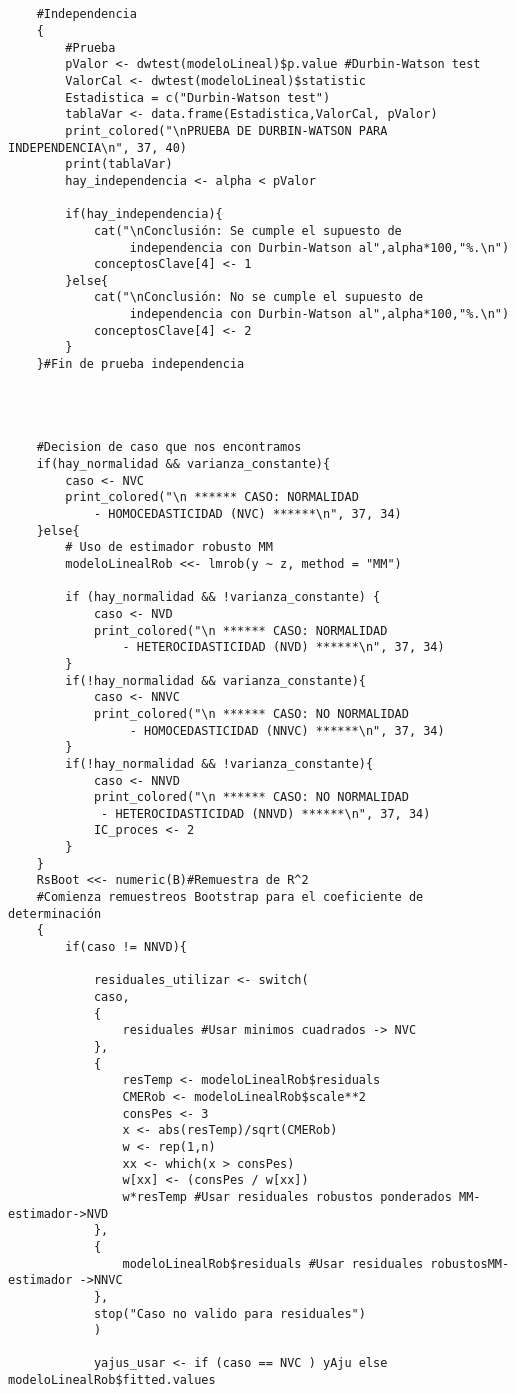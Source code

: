 \begin{verbatim}
	
	
	#Independencia
	{
		#Prueba
		pValor <- dwtest(modeloLineal)$p.value #Durbin-Watson test
		ValorCal <- dwtest(modeloLineal)$statistic
		Estadistica = c("Durbin-Watson test")
		tablaVar <- data.frame(Estadistica,ValorCal, pValor)
		print_colored("\nPRUEBA DE DURBIN-WATSON PARA INDEPENDENCIA\n", 37, 40)
		print(tablaVar)
		hay_independencia <- alpha < pValor
		
		if(hay_independencia){
			cat("\nConclusión: Se cumple el supuesto de
				 independencia con Durbin-Watson al",alpha*100,"%.\n")
			conceptosClave[4] <- 1
		}else{
			cat("\nConclusión: No se cumple el supuesto de
				 independencia con Durbin-Watson al",alpha*100,"%.\n")
			conceptosClave[4] <- 2
		}
	}#Fin de prueba independencia
	
	
	
	
	#Decision de caso que nos encontramos
	if(hay_normalidad && varianza_constante){
		caso <- NVC
		print_colored("\n ****** CASO: NORMALIDAD 
			- HOMOCEDASTICIDAD (NVC) ******\n", 37, 34)
	}else{
		# Uso de estimador robusto MM  
		modeloLinealRob <<- lmrob(y ~ z, method = "MM")
		
		if (hay_normalidad && !varianza_constante) {
			caso <- NVD
			print_colored("\n ****** CASO: NORMALIDAD 
				- HETEROCIDASTICIDAD (NVD) ******\n", 37, 34)
		}
		if(!hay_normalidad && varianza_constante){
			caso <- NNVC
			print_colored("\n ****** CASO: NO NORMALIDAD
				 - HOMOCEDASTICIDAD (NNVC) ******\n", 37, 34)
		}
		if(!hay_normalidad && !varianza_constante){
			caso <- NNVD
			print_colored("\n ****** CASO: NO NORMALIDAD
			 - HETEROCIDASTICIDAD (NNVD) ******\n", 37, 34)
			IC_proces <- 2
		}
	}
	RsBoot <<- numeric(B)#Remuestra de R^2
	#Comienza remuestreos Bootstrap para el coeficiente de determinación
	{
		if(caso != NNVD){
			
			residuales_utilizar <- switch(
			caso,
			{
				residuales #Usar minimos cuadrados -> NVC
			},
			{
				resTemp <- modeloLinealRob$residuals 
				CMERob <- modeloLinealRob$scale**2
				consPes <- 3
				x <- abs(resTemp)/sqrt(CMERob)
				w <- rep(1,n)
				xx <- which(x > consPes) 
				w[xx] <- (consPes / w[xx])
				w*resTemp #Usar residuales robustos ponderados MM-estimador->NVD
			},
			{
				modeloLinealRob$residuals #Usar residuales robustosMM-estimador ->NNVC
			},
			stop("Caso no valido para residuales")
			)
			
			yajus_usar <- if (caso == NVC ) yAju else modeloLinealRob$fitted.values
			

\end{verbatim}

